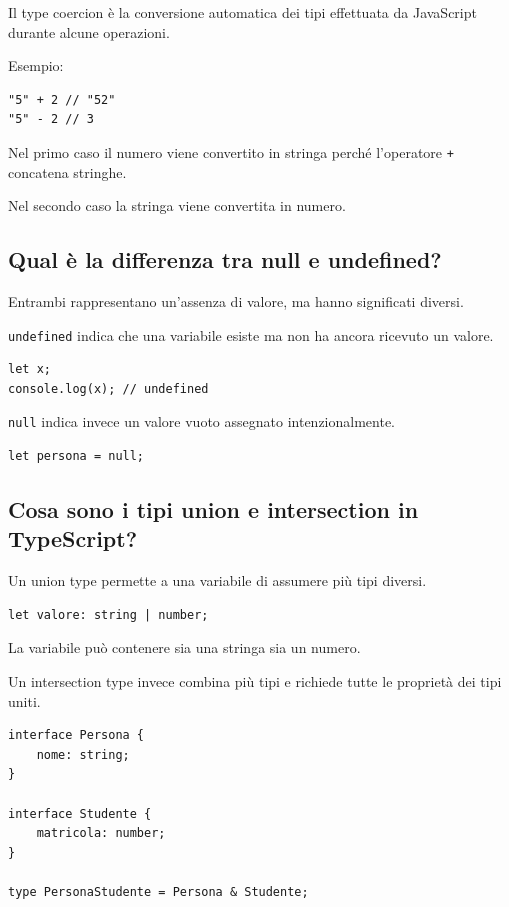 \documentclass[12pt]{article}
\begin{document}
Il type coercion è la conversione automatica dei tipi effettuata da JavaScript durante alcune operazioni.

Esempio:

\begin{verbatim}
"5" + 2 // "52"
"5" - 2 // 3
\end{verbatim}

Nel primo caso il numero viene convertito in stringa perché l'operatore \texttt{+} concatena stringhe.

Nel secondo caso la stringa viene convertita in numero.


\subsection{Qual è la differenza tra null e undefined?}

Entrambi rappresentano un'assenza di valore, ma hanno significati diversi.

\texttt{undefined} indica che una variabile esiste ma non ha ancora ricevuto un valore.

\begin{verbatim}
let x;
console.log(x); // undefined
\end{verbatim}

\texttt{null} indica invece un valore vuoto assegnato intenzionalmente.

\begin{verbatim}
let persona = null;
\end{verbatim}


\subsection{Cosa sono i tipi union e intersection in TypeScript?}

Un union type permette a una variabile di assumere più tipi diversi.

\begin{verbatim}
let valore: string | number;
\end{verbatim}

La variabile può contenere sia una stringa sia un numero.

Un intersection type invece combina più tipi e richiede tutte le proprietà dei tipi uniti.

\begin{verbatim}
interface Persona {
    nome: string;
}

interface Studente {
    matricola: number;
}

type PersonaStudente = Persona & Studente;
\end{verbatim}
\end{document}
